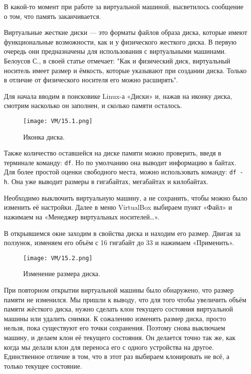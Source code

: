 В какой-то момент при работе за виртуальной машиной, высветилось сообщение о том, что память заканчивается. 

Виртуальные жесткие диски — это форматы файлов образа диска, которые имеют функциональные возможности, как и у физического жесткого диска. В первую очередь они предназначены для использования с виртуальными машинами. Белоусов С., в своей статье отмечает: "Как и физический диск, виртуальный носитель имеет размер и ёмкость, которые указывают при создании диска. Только в отличие от физического носителя его можно расширять".

Для начала вводим в поисковике Linux-а «Диски» и, нажав на иконку диска, смотрим насколько он заполнен, и сколько памяти осталось. 

\begin{figure}[h]
		\centering
		\texttt{[image: VM/15.1.png]}
\caption{Иконка диска.}
\label{ris:image}
\end{figure}

Также количество оставшейся на диске памяти можно проверить, введя в терминале команду: \texttt{df}. Но по умолчанию она выводит информацию в байтах. Для более простой оценки свободного места, можно использовать команду: \texttt{df -h}. Она уже выводит размеры в гигабайтах, мегабайтах и килобайтах.

Необходимо выключить виртуальную машину, а не сохранить, чтобы можно было изменить её настройки. Далее в меню VirtualBox выбираем пункт «Файл» и нажимаем на «Менеджер виртуальных носителей…».

В открывшемся окне заходим в свойства диска и находим его размер. Двигая за ползунок, изменяем его объём с 16 гигабайт до 33 и нажимаем «Применить». 

\begin{figure}[h]
		\centering
		\texttt{[image: VM/15.2.png]}
\caption{Изменение размера диска.}
\label{ris:image}
\end{figure}

При повторном открытии виртуальной машины было обнаружено, что размер памяти не изменился. Мы пришли к выводу, что для того чтобы увеличить объём памяти жёсткого диска, нужно сделать клон текущего состояния виртуальной машины или удалить снимки. К сожалению изменять размер диска, просто нельзя, пока существуют его точки сохранения. Поэтому снова выключаем машину, и делаем клон её текущего состояния. Он делается точно так же, как когда мы делали клон для переноса его с одного устройства на другое. Единственное отличие в том, что в этот раз выбираем клонировать не всё, а только текущее состояние. 

